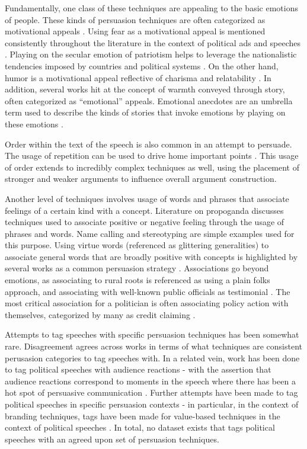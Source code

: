 \documentclass[letterpaper]{article}
\begin{document}
Fundamentally, one class of these techniques are appealing to the basic emotions of people. These kinds of persuasion techniques are often categorized as motivational appeals \cite{gassPersuasion,kaid2000}. Using fear as a motivational appeal is mentioned consistently throughout the literature in the context of political ads and speeches \cite{gassPersuasion,brader2005}. Playing on the secular emotion of patriotism helps to leverage the nationalistic tendencies imposed by countries and political systems \cite{gassPersuasion}. On the other hand, humor is a motivational appeal reflective of charisma and relatability \cite{gassPersuasion}. In addition, several works hit at the concept of warmth conveyed through story, often categorized as ``emotional'' appeals. Emotional anecdotes are an umbrella term used to describe the kinds of stories that invoke emotions by playing on these emotions \cite{gassPersuasion,brader2005}. 

Order within the text of the speech is also common in an attempt to persuade. The usage of repetition can be used to drive home important points \cite{gassPersuasion}. This usage of order extends to incredibly complex techniques as well, using the placement of stronger and weaker arguments to influence overall argument construction. 

Another level of techniques involves usage of words and phrases that associate feelings of a certain kind with a concept. Literature on propoganda discusses techniques used to associate positive or negative feeling through the usage of phrases and words. Name calling and stereotyping are simple examples used for this purpose. Using virtue words (referenced as glittering generalities) to associate general words that are broadly positive with concepts is highlighted by several works as a common persuasion strategy \cite{millerPropaganda,conway2007}. Associations go beyond emotions, as associating to rural roots is referenced as using a plain folks approach, and associating with well-known public officials as testimonial \cite{millerPropaganda,conway2007}. The most critical association for a politician is often associating policy action with themselves, categorized by many as credit claiming \cite{mayhew1974,carson2011}.

Attempts to tag speeches with specific persuasion techniques has been somewhat rare. Disagreement agrees across works in terms of what techniques are consistent perusasion categories to tag speeches with. In a related vein, work has been done to tag political speeches with audience reactions - with the assertion that audience reactions correspond to moments in the speech where there has been a hot spot of persuasive communication \cite{guerini2010}. Further attempts have been made to tag political speeches in specific persuasion contexts - in particular, in the context of branding techniques, tags have been made for value-based techniques in the context of political speeches \cite{barberio2006}. In total, no dataset exists that tags political speeches with an agreed upon set of persuasion techniques. 
\end{document}
